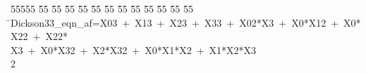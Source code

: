 %
%
\begin{tabbing}
55555 \= 55 \= 55 \= 55 \= 55 \= 55 \= 55 \= 55 \= 55 \= 55 \= 55 \= 55 \= 55 \= \>Dickson33\_eqn\_af=X03\ +\ X13\ +\ X23\ +\ X33\ +\ X02*X3\ +\ X0*X12\ +\ X0*X22\ +\ X22*\\[0pt]
\>X3\ +\ X0*X32\ +\ X2*X32\ +\ X0*X1*X2\ +\ X1*X2*X3\\[0pt]
2\>\end{tabbing}

